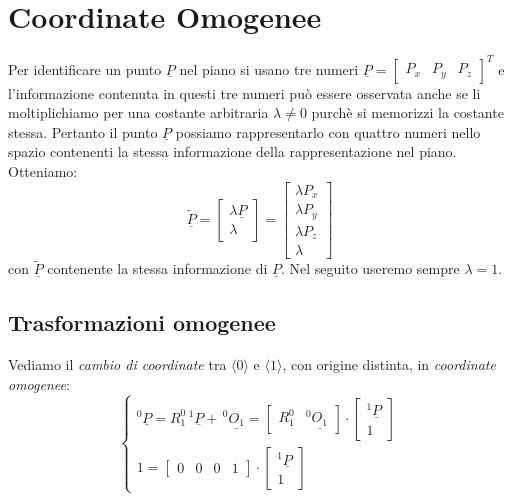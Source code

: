 \section{Coordinate Omogenee}
Per identificare un punto $\underline{P}$ nel piano si usano tre numeri $\underline{P}=
\begin{bmatrix}
	P_x & P_y & P_z
\end{bmatrix}^T$ 
e l'informazione contenuta in questi tre numeri può essere osservata anche se li moltiplichiamo per una costante arbitraria $\lambda \neq 0$ purchè si memorizzi la costante stessa. Pertanto il punto $\underline{P}$ possiamo rappresentarlo con quattro numeri nello spazio contenenti la stessa informazione della rappresentazione nel piano. Otteniamo:
\begin{equation}
	\underline{\tilde{P}} = 
	\begin{bmatrix}
		\lambda\underline{P} \\
		\lambda
	\end{bmatrix}
	=
	\begin{bmatrix}
		\lambda P_x \\
		\lambda P_y \\
		\lambda P_z \\
		\lambda
	\end{bmatrix}
\end{equation}
con $\underline{\tilde{P}}$ contenente la stessa informazione di $\underline{P}$. Nel seguito useremo sempre $\lambda = 1$.

\subsection{Trasformazioni omogenee}
Vediamo il \emph{cambio di coordinate} tra $\langle0\rangle$ e $\langle1\rangle$, con origine distinta, in \emph{coordinate omogenee}:
\begin{equation}
	\begin{cases}
		^0\underline{P} = R_1^0 \, ^1\underline{P} + \,^0\underline{O_1} = 			\begin{bmatrix}
			R_1^0 & ^0\underline{O_1}
		\end{bmatrix}
		\cdot
		\begin{bmatrix}
			^1\underline{P} \\
			1
		\end{bmatrix}\\
		1 = 
		\begin{bmatrix}
			0 & 0 & 0 & 1
		\end{bmatrix}
		\cdot
		\begin{bmatrix}
			^1\underline{P} \\
			1
		\end{bmatrix}
	\end{cases}
\end{equation}

